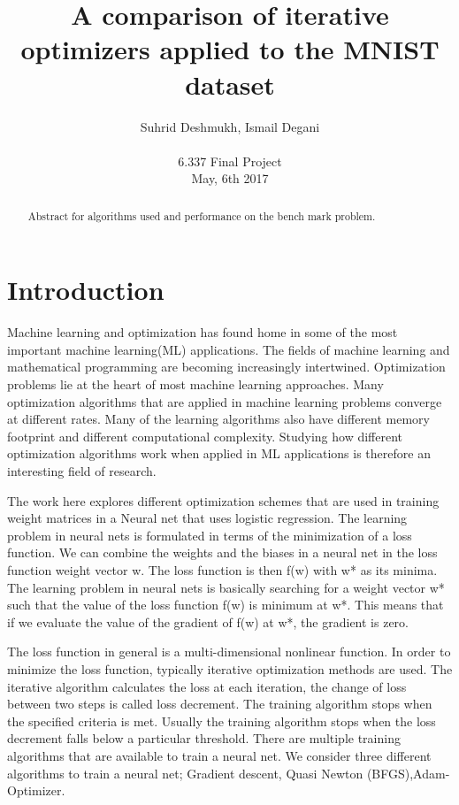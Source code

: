 \documentclass[10pt,twocolumn]{article}
\begin{document}
\title{A comparison of iterative optimizers applied to the MNIST dataset}

\author{Suhrid Deshmukh, Ismail Degani\\
\\
6.337 Final Project\\
May, 6th 2017\\
}

\maketitle
\thispagestyle{empty}

\begin{abstract}
   Abstract for algorithms used and performance on the bench mark problem.
\end{abstract}

\section{Introduction}

Machine learning and optimization has found home in some of the most important machine learning(ML) applications. The fields of machine learning and mathematical programming are becoming increasingly intertwined\cite{munoz2014machine}. Optimization problems lie at the heart of most machine learning approaches. Many optimization algorithms that  are applied in machine learning problems converge at different rates. Many of the learning algorithms also have different memory footprint and different computational complexity. Studying how different optimization algorithms work when applied in ML applications is therefore an interesting field of research.

The work here explores different optimization schemes that are used in training weight matrices in a Neural net that uses logistic regression. The learning problem in neural nets is formulated in terms of the minimization of a loss function. We can combine the weights and the biases in a neural net in the loss function weight vector w. The loss function is then f(w) with w* as its minima. The learning problem in neural nets is basically searching for a weight vector w* such that the value of the loss function f(w) is minimum at w*. This means that if we evaluate the value of the gradient of f(w) at w*, the gradient is zero.

The loss function in general is a multi-dimensional nonlinear function. In order to minimize the loss function, typically iterative optimization methods are used. The iterative algorithm calculates the loss at each iteration, the change of loss between two steps is called loss decrement. The training algorithm stops when the specified criteria is met. Usually the training algorithm stops when the loss decrement falls below a particular threshold. There are multiple training algorithms that are available to train a neural net. We consider three  different algorithms to train a neural net; Gradient descent, Quasi Newton (BFGS),Adam-Optimizer.
\end{document}
